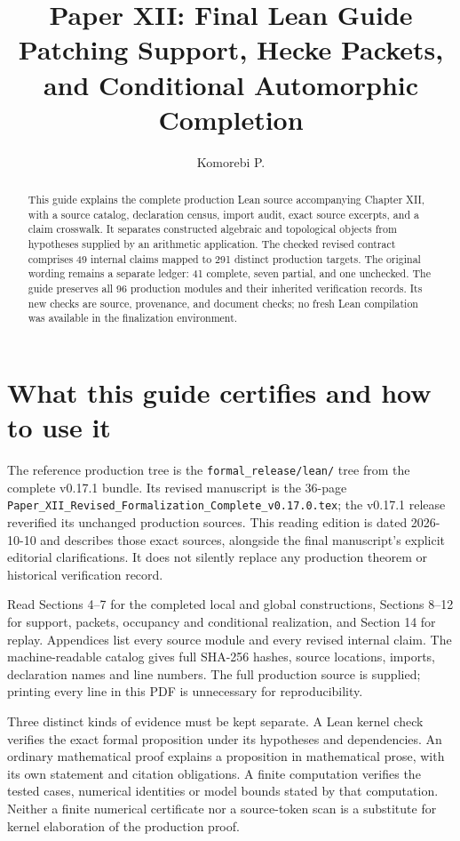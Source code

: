 \documentclass[11pt]{article}
\title{Paper XII: Final Lean Guide\\\large Patching Support, Hecke Packets, and Conditional Automorphic Completion}
\author{Komorebi P.}\date{}
\newcommand{\code}[1]{\nolinkurl{#1}}
\begin{document}
\KomorebiCover


\relax
\begin{abstract}
This guide explains the complete production Lean source accompanying Chapter XII, with a source catalog, declaration census, import audit, exact source excerpts, and a claim crosswalk. It separates constructed algebraic and topological objects from hypotheses supplied by an arithmetic application. The checked revised contract comprises 49 internal claims mapped to 291 distinct production targets. The original wording remains a separate ledger: 41 complete, seven partial, and one unchecked. The guide preserves all 96 production modules and their inherited verification records. Its new checks are source, provenance, and document checks; no fresh Lean compilation was available in the finalization environment.
\end{abstract}
{\setlength{\parskip}{0pt}\linespread{1.0}\selectfont\tableofcontents}
\newpage

\section{What this guide certifies and how to use it}
The reference production tree is the \code{formal_release/lean/} tree from the complete v0.17.1 bundle. Its revised manuscript is the 36-page \code{Paper_XII_Revised_Formalization_Complete_v0.17.0.tex}; the v0.17.1 release reverified its unchanged production sources. This reading edition is dated 2026-10-10 and describes those exact sources, alongside the final manuscript's explicit editorial clarifications. It does not silently replace any production theorem or historical verification record.

Read Sections 4--7 for the completed local and global constructions, Sections 8--12 for support, packets, occupancy and conditional realization, and Section 14 for replay. Appendices list every source module and every revised internal claim. The machine-readable catalog gives full SHA-256 hashes, source locations, imports, declaration names and line numbers. The full production source is supplied; printing every line in this PDF is unnecessary for reproducibility.

Three distinct kinds of evidence must be kept separate. A Lean kernel check verifies the exact formal proposition under its hypotheses and dependencies. An ordinary mathematical proof explains a proposition in mathematical prose, with its own statement and citation obligations. A finite computation verifies the tested cases, numerical identities or model bounds stated by that computation. Neither a finite numerical certificate nor a source-token scan is a substitute for kernel elaboration of the production proof.
\end{document}
